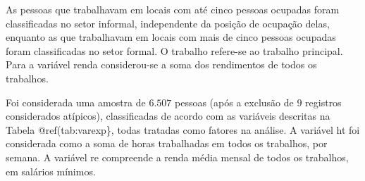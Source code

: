 \documentclass[]{book}
\numberwithin{example}{chapter}
\numberwithin{remark}{chapter}
\numberwithin{definition}{chapter}
\begin{document}
As pessoas que trabalhavam em locais com até cinco pessoas ocupadas
foram classificadas no setor informal, independente da posição de
ocupação delas, enquanto as que trabalhavam em locais com mais de cinco
pessoas ocupadas foram classificadas no setor formal. O trabalho
refere-se ao trabalho principal. Para a variável renda considerou-se a
soma dos rendimentos de todos os trabalhos.

Foi considerada uma amostra de \(6.507\) pessoas (após a exclusão de
\(9\) registros considerados atípicos), classificadas de acordo com as
variáveis descritas na Tabela @ref(tab:varexp\}, todas tratadas como
fatores na análise. A variável ht foi considerada como a soma de horas
trabalhadas em todos os trabalhos, por semana. A variável re compreende
a renda média mensal de todos os trabalhos, em salários mínimos.
\end{document}
